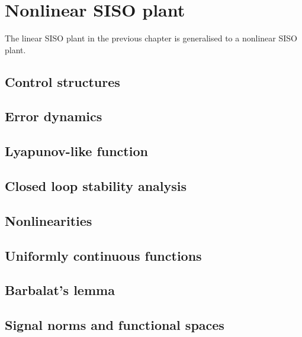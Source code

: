 \section{Nonlinear SISO plant}
The linear SISO plant in the previous chapter is generalised to
a nonlinear SISO plant.\\



\subsection{Control structures}


\subsection{Error dynamics}


\subsection{Lyapunov-like function}


\subsection{Closed loop stability analysis}


\subsection{Nonlinearities}


\subsection{Uniformly continuous functions}
\label{ch:uniform-continuous}


\subsection{Barbalat's lemma}
\label{ch:barbalat}


\subsection{Signal norms and functional spaces}


